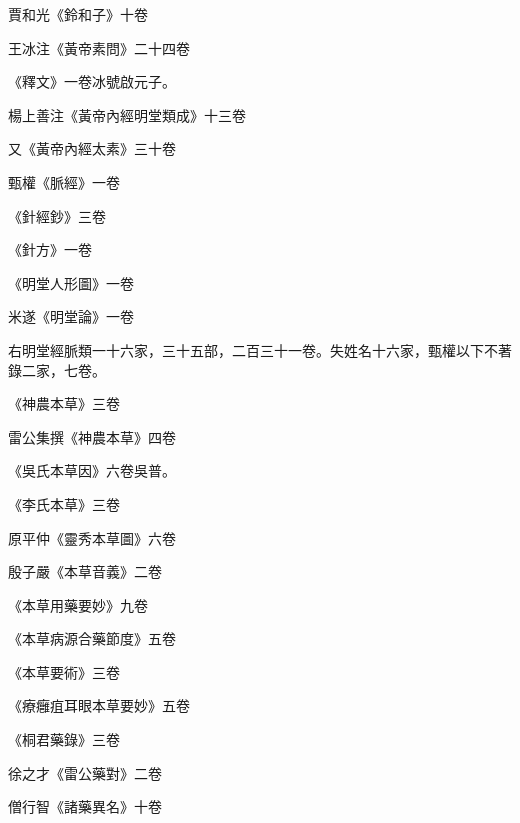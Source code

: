 \begin{pinyinscope}
 賈和光《鈴和子》十卷



 王冰注《黃帝素問》二十四卷



 《釋文》一卷冰號啟元子。



 楊上善注《黃帝內經明堂類成》十三卷



 又《黃帝內經太素》三十卷



 甄權《脈經》一卷



 《針經鈔》三卷



 《針方》一卷



 《明堂人形圖》一卷



 米遂《明堂論》一卷



 右明堂經脈類一十六家，三十五部，二百三十一卷。失姓名十六家，甄權以下不著錄二家，七卷。



 《神農本草》三卷



 雷公集撰《神農本草》四卷



 《吳氏本草因》六卷吳普。



 《李氏本草》三卷



 原平仲《靈秀本草圖》六卷



 殷子嚴《本草音義》二卷



 《本草用藥要妙》九卷



 《本草病源合藥節度》五卷



 《本草要術》三卷



 《療癰疽耳眼本草要妙》五卷



 《桐君藥錄》三卷



 徐之才《雷公藥對》二卷



 僧行智《諸藥異名》十卷




\end{pinyinscope}
